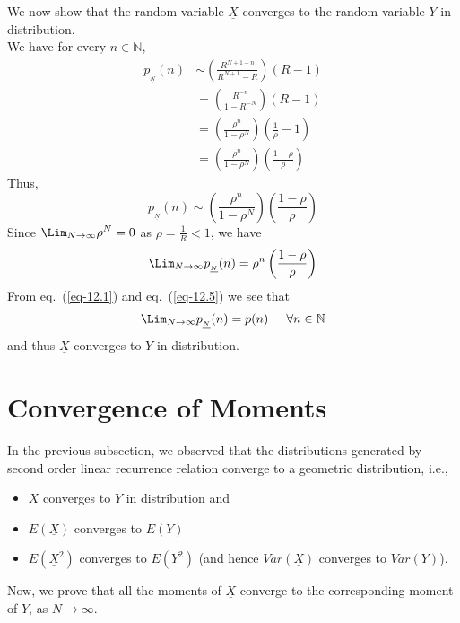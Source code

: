 \begin{multicols}{2}
We now show that the random variable $\underline{X}$ converges to the random variable $Y$ in distribution. \\
We have for every $n \in \mathbb N$,
\begin{align}
p_{_{\underline{N}}}(n) &\sim \left(\displaystyle{\frac{R^{N+1-n}}{R^{N+1}- R}}\right)(R-1)\nonumber\\
&= \left(\displaystyle{\frac{R^{-n}}{1-R^{-N}}}\right)(R-1)\nonumber\\
&= \left(\displaystyle{\frac{\rho^{n}}{1-\rho^{N}}}\right)\left(\displaystyle{\frac{1}{\rho}}-1\right)\nonumber\\
&= \left(\displaystyle{\frac{\rho^{n}}{1-\rho^{N}}}\right)\left(\displaystyle{\frac{1-\rho}{\rho}}\right)\nonumber
\end{align}
Thus,
\begin{equation}\nonumber
p_{_{\underline{N}}}(n) \sim \left(\displaystyle{\frac{\rho^{n}}{1-\rho^{N}}}\right)\left(\displaystyle{\frac{1-\rho}{\rho}}\right)
\end{equation}
Since $\displaystyle{\Lim_{N \rightarrow \infty}}\rho^N = 0$ as $\rho = \displaystyle{\frac{1}{R}} < 1$, we have
\begin{equation}
\displaystyle{\Lim_{N \rightarrow \infty}}p_{_{\underline{N}}}(n) = \rho^{n}\left(\displaystyle{\frac{1-\rho}{\rho}}\right)\label{eq-12.5}
\end{equation}
From eq.~(\ref{eq-12.1}) and eq.~(\ref{eq-12.5}) we see that
\begin{equation}
\displaystyle{\Lim_{N \rightarrow \infty}}p_{_{\underline{N}}}(n) = p(n) \hspace{0.2in} \forall n \in \mathbb N\label{eq-12.6}
\end{equation}
and thus $\underline{X}$ converges to $Y$ in distribution.

\section{Convergence of Moments}\label{section-13}
In the previous subsection, we observed that the distributions generated by second order linear recurrence relation converge to a geometric distribution, i.e., 
\begin{itemize}
\item $\underline{X}$ converges to $Y$ in distribution and 
\item $E(\underline{X})$ converges to $E(Y)$  
\item $E(\underline{X}^2)$ converges to $E(Y^2)$ (and hence $Var(\underline{X})$ converges to $Var(Y)$).
\end{itemize}
Now, we prove that all the moments of $\underline{X}$ converge to the corresponding moment of $Y$, as $N \rightarrow \infty$.


\end{multicols}
